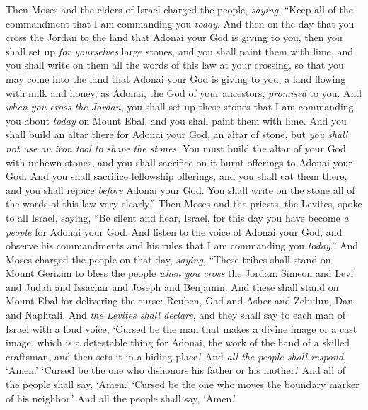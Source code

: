 \begin{biblechapter} %
 Then Moses and the elders of Israel charged the people, \textit{saying}, “Keep all of the commandment that I am commanding you \textit{today}.
\verse And then on the day that you cross the Jordan to the land that Adonai your God is giving to you, then you shall set up \textit{for yourselves} large stones, and you shall paint them with lime,
\verse and you shall write on them all the words of this law at your crossing, so that you may come into the land that Adonai your God is giving to you, a land flowing with milk and honey, as Adonai, the God of your ancestors, \textit{promised} to you.
\verse And \textit{when you cross the Jordan}, you shall set up these stones that I am commanding you about \textit{today} on Mount Ebal, and you shall paint them with lime.
\verse And you shall build an altar there for Adonai your God, an altar of stone, but \textit{you shall not use an iron tool to shape the stones}.
\verse You must build the altar of your God with unhewn stones, and you shall sacrifice on it burnt offerings to Adonai your God.
\verse And you shall sacrifice fellowship offerings, and you shall eat them there, and you shall rejoice \textit{before} Adonai your God.
\verse You shall write on the stone all of the words of this law very clearly.”
\verse Then Moses and the priests, the Levites, spoke to all Israel, saying, “Be silent and hear, Israel, for this day you have become \textit{a people} for Adonai your God.
\verse And listen to the voice of Adonai your God, and observe his commandments and his rules that I am commanding you \textit{today}.”
 And Moses charged the people on that day, \textit{saying},
\verse “These tribes shall stand on Mount Gerizim to bless the people \textit{when you cross} the Jordan: Simeon and Levi and Judah and Issachar and Joseph and Benjamin.
\verse And these shall stand on Mount Ebal for delivering the curse: Reuben, Gad and Asher and Zebulun, Dan and Naphtali.
\verse And \textit{the Levites shall declare}, and they shall say to each man of Israel with a loud voice,
\verse ‘Cursed be the man that makes a divine image or a cast image, which is a detestable thing for Adonai, the work of the hand of a skilled craftsman, and then sets it in a hiding place.’ And \textit{all the people shall respond}, ‘Amen.’
\verse ‘Cursed be the one who dishonors his father or his mother.’ And all of the people shall say, ‘Amen.’
\verse ‘Cursed be the one who moves the boundary marker of his neighbor.’ And all the people shall say, ‘Amen.’

\end{biblechapter}
